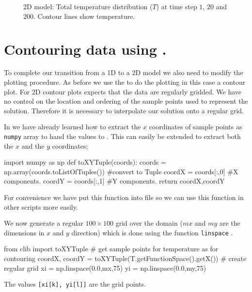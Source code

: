 \begin{figure}[h]
\caption{2D model: Total temperature distribution ($T$) at time step $1$, $20$ and $200$. Contour lines show temperature.}
\label{fig:twodhdans}
\end{figure}

\section{Contouring \esc data using \modmpl.}
\label{Sec:2DHD plot}
To complete our transition from a 1D to a 2D model we also need to modify the 
plotting procedure. As before we use the  \modmpl to do the plotting 
in this case a contour plot. For 2D contour plots \modmpl expects that the
data are regularly gridded. We have no control on the location and ordering of the sample points
used to represent the solution. Therefore it is necessary to interpolate our solution onto a regular grid.

In  we have already learned how to extract the $x$ coordinates of sample points as 
\verb|numpy| array to hand the values to \modmpl. This can easily be extended to extract both the
$x$ and the $y$ coordinates;
\begin{python}
import numpy as np
def toXYTuple(coords):
    coords = np.array(coords.toListOfTuples()) #convert to Tuple
    coordX = coords[:,0] #X components.
    coordY = coords[:,1] #Y components.
    return coordX,coordY
\end{python}
For convenience we have put this function into  file so we can use this
function in other scripts more easily. 


We now generate a regular $100 \times 100$ grid over the domain ($mx$ and $my$ 
are the dimensions in $x$ and $y$ direction) which is done using the \modnumpy function \verb|linspace|  . 
\begin{python}
from clib import toXYTuple
# get sample points for temperature as  for contouring      
coordX, coordY = toXYTuple(T.getFunctionSpace().getX())
# create regular grid
xi = np.linspace(0.0,mx,75)
yi = np.linspace(0.0,my,75)
\end{python}
The values \verb|[xi[k], yi[l]]| are the grid points.

